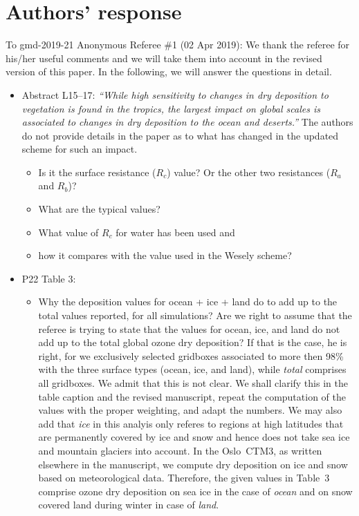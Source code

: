 \documentclass{scrartcl}
\begin{document}
\section*{Authors' response}
To gmd-2019-21 Anonymous Referee \#1 (02 Apr 2019):
We thank the referee for his/her useful comments and we will take them into account in the revised version of this paper.
In the following, we will answer the questions in detail.
\begin{itemize}
\item {\color{blue}  Abstract L15--17: \emph{“While high sensitivity to changes in dry deposition to
    vegetation is found in the tropics, the largest impact on global scales is associated to
    changes in dry deposition to the ocean and deserts.”} The authors do not provide details
  in the paper as to what has changed in the updated scheme for such an impact.
  \begin{itemize}
  \item Is it the surface resistance ($R_c$) value? Or the other two resistances ($R_a$ and $R_b$)?
  \item What are the typical values?
  \item What value of $R_c$ for water has been used and
  \item how it compares with the value used in the Wesely scheme?
  \end{itemize}
}
  \emph{}

\item {\color{blue}  P22 Table 3:}
  \begin{itemize}
  \item {\color{blue}  Why the deposition values for ocean + ice + land do to add up to the total
    values reported, for all simulations?}
    Are we right to assume that the referee is trying to state that the values for ocean, ice, and land do
    not add up to the total global ozone dry deposition? If that is the case, he is right, for we exclusively
    selected gridboxes associated to more then 98\% with the three surface types (ocean, ice, and land), while
    \emph{total} comprises all gridboxes. We admit that this is not clear.
    We shall clarify this in the table caption and the revised manuscript, repeat the computation of the values
    with the proper weighting, and adapt the numbers.
    We may also add that \emph{ice} in this analyis only
    referes to regions at high latitudes that are permanently covered by ice and snow and hence does not take
    sea ice and mountain glaciers into account. In the Oslo~CTM3, as written elsewhere in the manuscript, we
    compute dry deposition on ice and snow based on meteorological data. Therefore, the given values in Table~3
    comprise ozone dry deposition on sea ice in the case of \emph{ocean} and on snow covered land during winter
    in case of \emph{land}.
   

\end{itemize}
\end{itemize}
\end{document}
